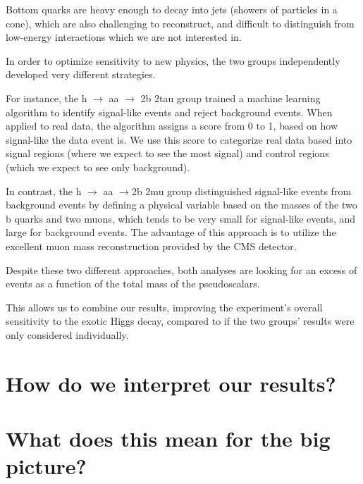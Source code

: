 \documentclass{article}
\begin{document}
Bottom quarks are heavy enough to decay into jets (showers of particles in a cone), which are also challenging to reconstruct, and difficult to distinguish from low-energy interactions which we are not interested in.

In order to optimize sensitivity to new physics, the two groups independently developed very different strategies.

For instance, the h $\rightarrow$ aa $\rightarrow$ 2b 2tau group trained a machine learning algorithm to identify signal-like events and reject background events. When applied to real data, the algorithm assigns a score from 0 to 1, 
based on how signal-like the data event is. We use this score to categorize real data based into signal regions (where we expect to see the most signal) and control regions (which we expect to see only background). 

In contrast, the h $\rightarrow$ aa $\rightarrow$2b 2mu group distinguished signal-like events from background events by defining a physical variable based on the masses of the two b quarks and two muons, which tends to be very small for signal-like events,
and large for background events. The advantage of this approach is to utilize the excellent muon mass reconstruction provided by the CMS detector. 

Despite these two different approaches, both analyses are looking for an excess of events as a function of the total mass of the pseudoscalars. 

This allows us to combine our results, improving the experiment's overall sensitivity to the exotic Higgs decay, compared to if the two groups' results were only considered individually. 

\section{How do we interpret our results?}



\section{What does this mean for the big picture?}
\end{document}
